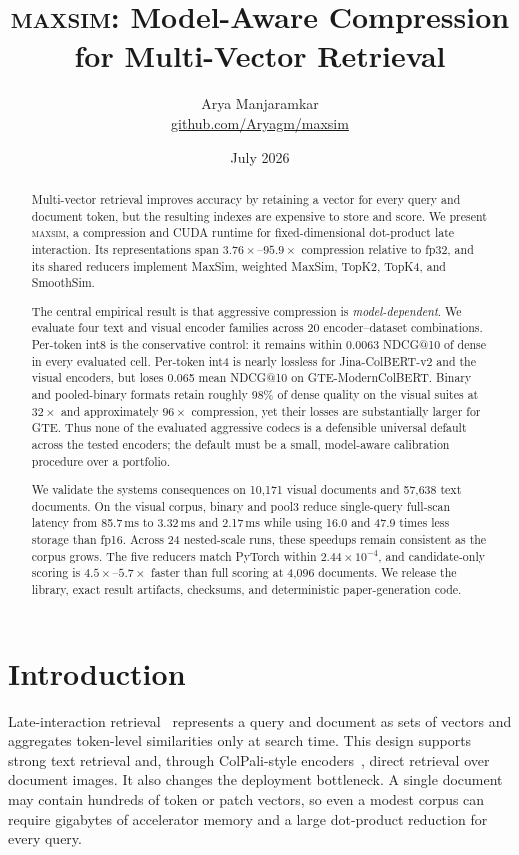 \documentclass{article}
\title{\textsc{maxsim}: Model-Aware Compression for Multi-Vector Retrieval}
\author{Arya Manjaramkar\\
\href{https://github.com/Aryagm/maxsim}{github.com/Aryagm/maxsim}}
\date{July 2026}
\makeatletter
\newcommand{\sysname}{\textsc{maxsim}}
\newcommand{\ndcg}{NDCG@10}
\makeatother
\begin{document}
\maketitle

\begin{abstract}
Multi-vector retrieval improves accuracy by retaining a vector for every query
and document token, but the resulting indexes are expensive to store and
score. We present \sysname{}, a compression and CUDA runtime for
fixed-dimensional dot-product late interaction. Its representations span
$3.76\times$--$95.9\times$ compression relative to fp32, and its shared
reducers implement MaxSim, weighted MaxSim, TopK2, TopK4, and SmoothSim.

The central empirical result is that aggressive compression is
\emph{model-dependent}. We evaluate four text and visual encoder families
across 20 encoder--dataset combinations. Per-token int8 is the conservative
control: it remains within 0.0063 \ndcg{} of dense in every evaluated cell.
Per-token int4 is nearly lossless for Jina-ColBERT-v2 and the visual encoders,
but loses 0.065 mean \ndcg{} on GTE-ModernColBERT. Binary and pooled-binary
formats retain roughly 98\% of dense quality on the visual suites at
$32\times$ and approximately $96\times$ compression, yet their losses are
substantially larger for GTE. Thus none of the evaluated aggressive codecs is
a defensible universal default across the tested encoders; the default must
be a small, model-aware calibration procedure over a portfolio.

We validate the systems consequences on 10,171 visual documents and 57,638
text documents. On the visual corpus, binary and pool3 reduce single-query
full-scan latency from 85.7\,ms to 3.32\,ms and 2.17\,ms while using 16.0 and
47.9 times less storage than fp16. Across 24 nested-scale runs, these speedups
remain consistent as the corpus grows. The five reducers match PyTorch within
$2.44{\times}10^{-4}$, and candidate-only scoring is $4.5\times$--$5.7\times$
faster than full scoring at 4,096 documents. We release the library, exact
result artifacts, checksums, and deterministic paper-generation code.
\end{abstract}

\section{Introduction}

Late-interaction retrieval~\citep{khattab2020colbert} represents a query and
document as sets of vectors and aggregates token-level similarities only at
search time. This design supports strong text retrieval and, through
ColPali-style encoders~\citep{faysse2025colpali}, direct retrieval over
document images. It also changes the deployment bottleneck. A single
document may contain hundreds of token or patch vectors, so even a modest
corpus can require gigabytes of accelerator memory and a large dot-product
reduction for every query.
\end{document}
